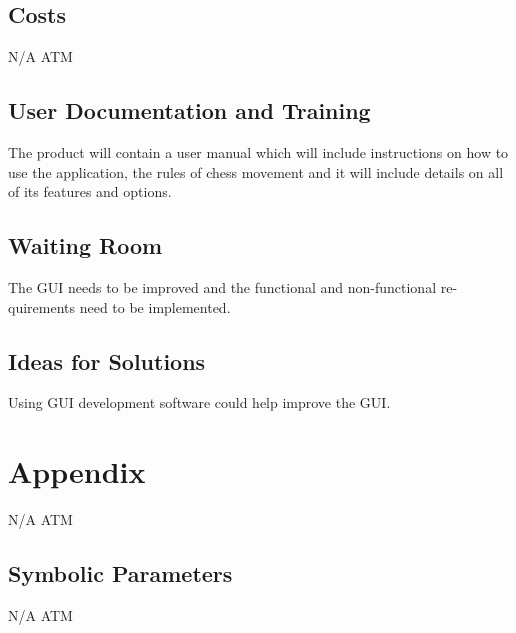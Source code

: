 \documentclass[12pt, titlepage]{article}
\begin{document}
\subsection{Costs}
N/A ATM
\subsection{User Documentation and Training}
The product will contain a user manual which will include instructions on
how to use the application, the rules of chess movement and it will include details on all of its features
and options.
\subsection{Waiting Room}
The GUI needs to be improved and the functional and non-functional re-
quirements need to be implemented.
\subsection{Ideas for Solutions}
Using GUI development software could help improve the GUI.







\newpage

\section{Appendix}

N/A ATM

\subsection{Symbolic Parameters}

N/A ATM
\end{document}
